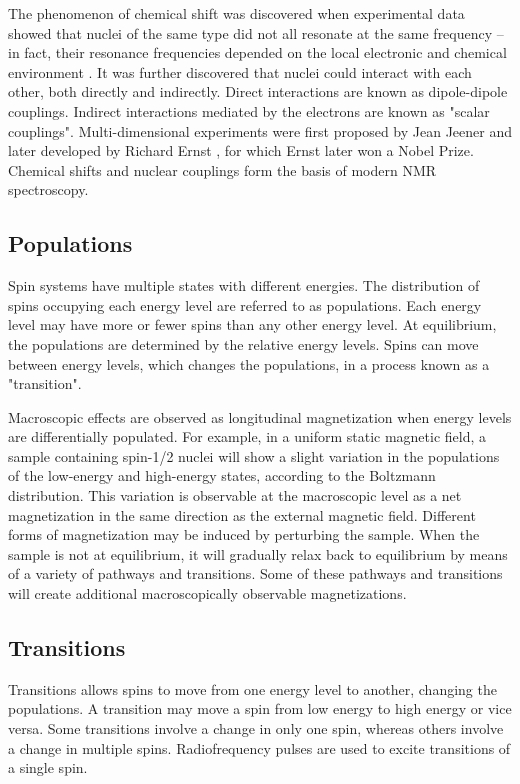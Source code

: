 The phenomenon of chemical shift was discovered when experimental data showed
that nuclei of the same type did not all resonate at the same frequency -- in
fact, their resonance frequencies depended on the local electronic and 
chemical environment \cite{arnold1951variations}.  
It was further discovered that nuclei could interact
with each other, both directly and indirectly.  Direct interactions are 
known as dipole-dipole couplings.  Indirect interactions mediated
by the electrons are known as "scalar couplings".
Multi-dimensional experiments were first proposed by Jean Jeener 
\cite{jeener1979investigation} and later developed by Richard Ernst
\cite{ernst1992nuclear}, for which Ernst later won a Nobel Prize.  
Chemical shifts and nuclear couplings form the basis of modern NMR 
spectroscopy.


\subsection*{Populations}

Spin systems have multiple states with different energies.  The distribution
of spins occupying each energy level are referred to as populations.  Each
energy level may have more or fewer spins than any other energy level.
At equilibrium, the populations are determined by the relative energy levels.  
Spins can move between energy levels, which changes the populations, in a 
process known as a "transition".

Macroscopic effects are observed as longitudinal magnetization
when energy levels are differentially 
populated.  For example, in a uniform static magnetic field, a sample 
containing spin-1/2 nuclei will show a slight variation in the populations of 
the low-energy and high-energy states, according to the Boltzmann distribution.  
This variation is observable at the macroscopic level as a net magnetization in 
the same direction as the external magnetic field.  Different forms of magnetization
may be induced by perturbing the sample.  When the sample is not at equilibrium,
it will gradually relax back to equilibrium by means of a variety of
pathways and transitions.  Some of these pathways and transitions will create
additional macroscopically observable magnetizations.


\subsection*{Transitions}

Transitions allows spins to move from one energy level to another, changing 
the populations.
A transition may move a spin from low energy to high energy or vice versa.
Some transitions involve a change in only one spin, whereas others involve a
change in multiple spins.  Radiofrequency pulses are used to excite transitions
of a single spin.

